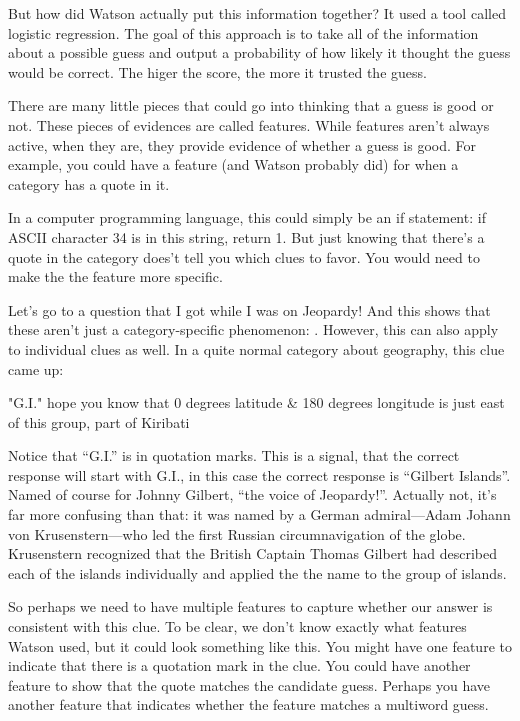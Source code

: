 But how did Watson actually put this information together?  It used a tool called logistic regression.  The goal of this approach is to take all of the information about a possible guess and output a probability of how likely it thought the guess would be correct.  The higer the score, the more it trusted the guess.

There are many little pieces that could go into thinking that a guess is good or not.  These pieces of evidences are called features.  While features aren’t always active, when they are, they provide evidence of whether a guess is good.  For example, you could have a feature (and Watson probably did) for when a category has a quote in it.

In a computer programming language, this could simply be an if statement: if ASCII character 34 is in this string, return 1.  But just knowing that there’s a quote in the category does’t tell you which clues to favor.  You would need to make the the feature more specific.

Let’s go to a question that I got while I was on Jeopardy!  And this shows that these aren’t just a category-specific phenomenon: .  However, this can also apply to individual clues as well.  In a quite normal category about geography, this clue came up:

"G.I." hope you know that 0 degrees latitude \& 180 degrees longitude is just east of this group, part of Kiribati

Notice that “G.I.” is in quotation marks.  This is a signal, that the correct response will start with G.I., in this case the correct response is “Gilbert Islands”.   Named of course for Johnny Gilbert, “the voice of Jeopardy!”.  Actually not, it’s far more confusing than that: it was named by a German admiral—Adam Johann von Krusenstern—who led the first Russian circumnavigation of the globe.  Krusenstern recognized that the British Captain Thomas Gilbert had described each of the islands individually and applied the the name to the group of islands.

So perhaps we need to have multiple features to capture whether our answer is consistent with this clue.  To be clear, we don’t know exactly what features Watson used, but it could look something like this.  You might have one feature to indicate that there is a quotation mark in the clue.  You could have another feature to show that the quote matches the candidate guess.  Perhaps you have another feature that indicates whether the feature matches a multiword guess.

